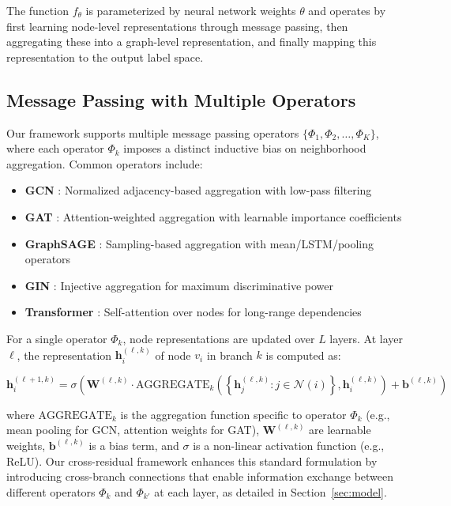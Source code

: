 The function $f_\theta$ is parameterized by neural network weights $\theta$ and operates by first learning node-level representations through message passing, then aggregating these into a graph-level representation, and finally mapping this representation to the output label space.

\subsection{Message Passing with Multiple Operators}

Our framework supports multiple message passing operators $\{\Phi_1, \Phi_2, \ldots, \Phi_K\}$, where each operator $\Phi_k$ imposes a distinct inductive bias on neighborhood aggregation. Common operators include:
\begin{itemize}
    \item \textbf{GCN} \cite{kipf2016semi}: Normalized adjacency-based aggregation with low-pass filtering
    \item \textbf{GAT} \cite{velivckovic2017graph}: Attention-weighted aggregation with learnable importance coefficients
    \item \textbf{GraphSAGE} \cite{hamilton2017inductive}: Sampling-based aggregation with mean/LSTM/pooling operators
    \item \textbf{GIN} \cite{xu2018powerful}: Injective aggregation for maximum discriminative power
    \item \textbf{Transformer} \cite{dwivedi2020generalization}: Self-attention over nodes for long-range dependencies
\end{itemize}

For a single operator $\Phi_k$, node representations are updated over $L$ layers. At layer $\ell$, the representation $\mathbf{h}_i^{(\ell, k)}$ of node $v_i$ in branch $k$ is computed as:

\begin{equation}
\mathbf{h}_i^{(\ell+1, k)} = \sigma\left(\mathbf{W}^{(\ell, k)} \cdot \text{AGGREGATE}_k\left(\left\{\mathbf{h}_j^{(\ell, k)} : j \in \mathcal{N}(i)\right\}, \mathbf{h}_i^{(\ell, k)}\right) + \mathbf{b}^{(\ell, k)}\right)
\end{equation}

where $\text{AGGREGATE}_k$ is the aggregation function specific to operator $\Phi_k$ (e.g., mean pooling for GCN, attention weights for GAT), $\mathbf{W}^{(\ell, k)}$ are learnable weights, $\mathbf{b}^{(\ell, k)}$ is a bias term, and $\sigma$ is a non-linear activation function (e.g., ReLU). Our cross-residual framework enhances this standard formulation by introducing cross-branch connections that enable information exchange between different operators $\Phi_k$ and $\Phi_{k'}$ at each layer, as detailed in Section~\ref{sec:model}.

